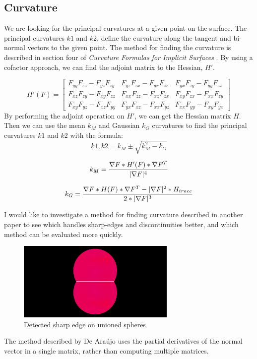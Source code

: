 \documentclass[conference]{acmsiggraph}
\begin{document}
\subsection{Curvature}
We are looking for the principal curvatures at a given point on the surface.
The principal curvatures $k1$ and $k2$, define the curvature along the tangent
and bi-normal vectors to the given point. The method for finding the curvature
is described in section four of \textit{Curvature Formulas for Implicit
Surfaces} \cite{Goldman2005}. By using a cofactor approach, we can find the adjoint matrix to the
Hessian, $H'$.

$$
H'(F) =
\begin{bmatrix}
	F_{yy}F_{zz} - F_{yz}F_{zy} & F_{yz}F_{zx} - F_{yx}F_{zz} & F_{yx}F_{zy} - F_{yy}F_{zx} \\
	F_{xz}F_{zy} - F_{xy}F_{zz} & F_{xx}F_{zz} - F_{xz}F_{zx} & F_{xy}F_{zx} - F_{xx}F_{zy} \\
	F_{xy}F_{yz} - F_{xz}F_{yy} & F_{yx}F_{xz} - F_{xx}F_{yz} & F_{xx}F_{yy} - F_{xy}F_{yx}
\end{bmatrix}
$$
By performing the adjoint operation on $H'$, we can get the
Hessian matrix $H$. Then we can use the mean $k_M$ and Gaussian $k_G$
curvatures to find
the principal curvatures $k1$ and $k2$ with the formula:
$$k1, k2 = k_M \pm \sqrt{k^2_{M} - k_G}$$

$$k_M = {\nabla F * H'(F) * \nabla F^T \over |\nabla F|^4}$$

$$k_G = {\nabla F * H(F) * \nabla F^T - |\nabla F|^2 * H_{trace} \over 2 *
|\nabla F|^3}$$

I would like to investigate a method for finding curvature described in another
paper\cite{DeAraujo2004} to see which handles sharp-edges and discontinuities
better, and which method can be evaluated more quickly.

\begin{figure}[htbp]
	\includegraphics[height=1.5in]{images/union_sharp.png}
	\caption{Detected sharp edge on unioned spheres}
	\label{fig:UnionSharpEdge}
\end{figure}


The method described by De Ara\'{u}jo uses the partial derivatives of the
normal vector in a single matrix, rather than computing multiple matrices.
\end{document}
